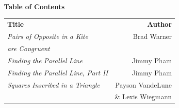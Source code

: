\documentclass{report}
\begin{document}
\center \Large \textbf{Table of Contents}\\[.25in]
\normalsize
\begin{tabular}{lr}
\textbf{Title} & \textbf{Author}\\[.25in]
\emph{Pairs of Opposite in a Kite} & Brad Warner \\
\hspace{.1in}\emph{are Congruent} \\[.25in]
\emph{Finding the Parallel Line} & Jimmy Pham \\[.25in]
\emph{Finding the Parallel Line, Part II} & Jimmy Pham \\[.25in]
\emph{Squares Inscribed in a Triangle} & Payson VandeLune \\
  & \& Lexis Wiegmann\\[.25in]
\end{tabular}





%
%
%
%
%
%
%
%
%
%
%
\end{document}
